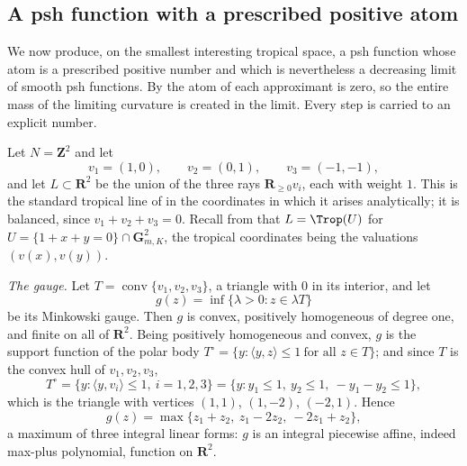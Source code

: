 \subsection{A psh function with a prescribed positive atom}
\label{sec:ch18-gauge}

We now produce, on the smallest interesting tropical space, a psh function
whose atom is a prescribed positive number and which is nevertheless a
decreasing limit of smooth psh functions.  By
 the atom of each approximant is zero, so
the entire mass of the limiting curvature is created in the limit.  Every
step is carried to an explicit number.

\begin{example}
\label{ex:ch18-gauge-atom}
%
Let $N=\mathbf Z^2$ and let
\begin{equation}
\label{eq:ch18-gauge-rays}
 v_1=(1,0),\qquad v_2=(0,1),\qquad v_3=(-1,-1),
\end{equation}
and let $L\subset\mathbf R^2$ be the union of the three rays
$\mathbf R_{\geq0}v_i$, each with weight $1$.  This is the standard tropical
line of  in the coordinates in which it arises
analytically; it is balanced, since $v_1+v_2+v_3=0$.  Recall from
 that $L=\Trop(U)$ for
$U=\{1+x+y=0\}\cap\mathbf G_{m,K}^2$, the tropical coordinates being the
valuations $(v(x),v(y))$.

\emph{The gauge.}  Let $T=\operatorname{conv}\{v_1,v_2,v_3\}$, a triangle
with $0$ in its interior, and let
\[
 g(z)=\inf\{\lambda>0:z\in\lambda T\}
\]
be its Minkowski gauge.  Then $g$ is convex, positively homogeneous of
degree one, and finite on all of $\mathbf R^2$.  Being positively
homogeneous and convex, $g$ is the support function of the polar body
$T^\circ=\{y:\langle y,z\rangle\leq1\ \text{for all }z\in T\}$; and since
$T$ is the convex hull of $v_1,v_2,v_3$,
\[
 T^\circ=\{y:\langle y,v_i\rangle\leq1,\ i=1,2,3\}
 =\{y:y_1\leq1,\ y_2\leq1,\ -y_1-y_2\leq1\},
\]
which is the triangle with vertices $(1,1)$, $(1,-2)$, $(-2,1)$.  Hence
\begin{equation}
\label{eq:ch18-gauge-maxplus}
 g(z)=\max\{z_1+z_2,\ z_1-2z_2,\ -2z_1+z_2\},
\end{equation}
a maximum of three integral linear forms: $g$ is an integral piecewise
affine, indeed max-plus polynomial, function on $\mathbf R^2$.


\end{example}
